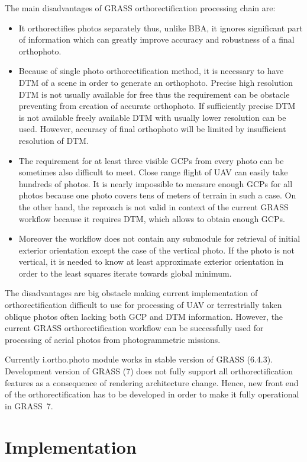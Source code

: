 \documentclass[a4paper,12pt]{article}
\begin{document}
The main disadvantages of GRASS orthorectification processing chain are:
\begin{itemize}
\item It orthorectifies photos separately thus, unlike BBA, it ignores significant part of information
 which can greatly improve accuracy and robustness of a final orthophoto. 
\item Because of single photo orthorectification method, it is necessary to have DTM of a scene
in order to generate an orthophoto. Precise high resolution DTM is not usually available for free thus the 
requirement can be obstacle preventing from creation of accurate orthophoto. If sufficiently precise 
DTM is not available freely available DTM with usually lower resolution can be used. However,  
accuracy of final orthophoto will be limited by insufficient resolution of DTM.
\item The requirement for at least three visible GCPs from every photo can be sometimes also difficult to meet.
Close range flight of UAV can easily take hundreds of photos.
It is nearly impossible to measure enough GCPs for all photos because  
one photo covers tens of meters of terrain in such a case. 
On the other hand, the reproach is not valid in context of the current GRASS workflow because it requires DTM, which allows 
to obtain enough GCPs.
\item Moreover the workflow does not contain any submodule for retrieval of initial exterior orientation except
 the case of the vertical photo.   If the photo 
is not vertical, it is needed to know at least approximate exterior orientation 
in order to the least squares iterate towards global minimum.
\end{itemize}

The disadvantages are big obstacle making current implementation of orthorectification difficult to use  
for processing of  UAV or terrestrially taken oblique photos often lacking both GCP and DTM information.
However, the current GRASS orthorectification workflow can be successfully used for processing
of aerial photos from photogrammetric missions.

Currently i.ortho.photo module works in stable version of GRASS (6.4.3).
Development version of GRASS (7) does not fully support all orthorectification features 
as a consequence of rendering architecture change.
Hence, new front end of the
orthorectification has to be developed in order to make it fully operational 
in GRASS~7. 

\section{Implementation}
\end{document}
